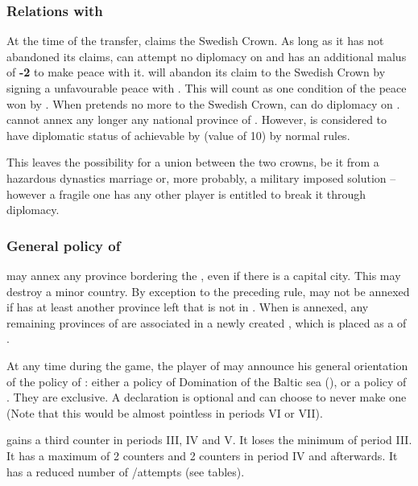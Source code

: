 \subsubsection{Relations with }
\label{chSpecific:Sweden:Denmark}
 At the time of the transfer,
 claims the Swedish Crown. As long as it has not
abandoned its claims, \SUE can attempt no diplomacy on 
and has an additional malus of {\bf -2} to make peace with it.
\aparag {} will abandon its claim to the Swedish Crown by
signing a unfavourable peace with \SUE. This will count as one condition
of the peace won by \SUE.
\bparag When  pretends no more to the Swedish Crown, \SUE
can do diplomacy on . 
\bparag \SUE cannot annex any longer any national province of .
However,  is considered to have diplomatic status of \ANNEXION 
achievable by \SUE (value of 10) by normal rules.
\begin{designnote}
This leaves the possibility for a union between the two crowns, be it from a
hazardous dynastics marriage or, more probably, a military imposed solution 
-- however a fragile one has any other player is entitled to break it through diplomacy.
\end{designnote}
\subsubsection{General policy of }
\aparag \SUE may annex any province bordering the ,
even if there is a capital city. This may destroy a minor country.
\bparag By exception to the preceding rule,  may not
be annexed if  has at least another province left that is
not in . When  is annexed, any
remaining provinces of  are associated in a newly created
, which is placed as a \VASSAL of \SUE. 

\aparag At any time during the game, the player of \SUE may announce his
general orientation of the policy of \SUE: either a policy of Domination
of the Baltic sea (), or a policy of
. They are exclusive. A declaration is
optional and \SUE can choose to never make one (Note that this would be
almost pointless in periods VI or VII).

\label{chSpecific:Sweden:DMB}
\bparag \SUE gains a third \ARMY counter in periods III, IV and V. It
loses the minimum \LeaderE of period III.
\bparag It has a maximum of 2 \TP counters and 2 \COL counters in period
IV and afterwards.
\bparag It has a reduced number of \TP/\COL attempts (see tables).

